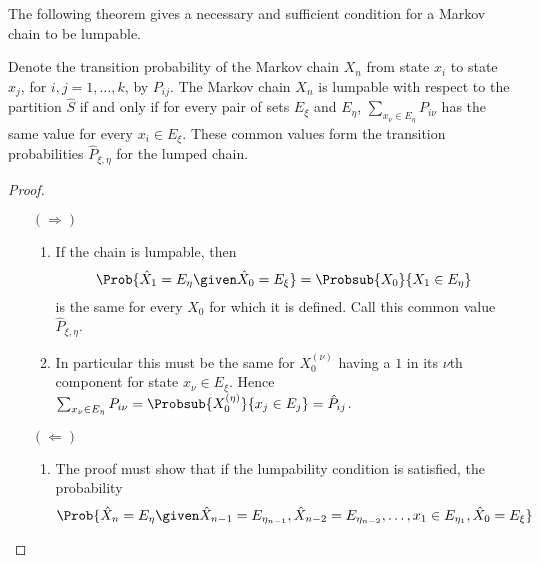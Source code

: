 \documentclass[12pt]{article}
\begin{document}
The following theorem gives a necessary and sufficient condition for a
Markov chain to be lumpable.

\begin{theorem}
    Denote the transition probability of the Markov chain \( X_n \) from
    state \( x_i \) to state \( x_j \), for \( i, j = 1, \dots, k \), by
    \( P_{ij} \).  The Markov chain \( X_n \) is lumpable with respect
    to the partition \( \hat{S} \) if and only if for every pair of sets
    \( E_{\xi} \) and \( E_{\eta} \), \( \sum_{x_{\nu} \in E_{\eta}} P_{i\nu}
    \) has the same value for every \( x_i \in E_{\xi} \). These common
    values form the transition probabilities \( \hat{P}_{\xi,\eta} \)
    for the lumped chain.
\end{theorem}

\begin{proof}
    \begin{enumerate}
        \item[\( (\Rightarrow) \)]
            \begin{enumerate}
                \item
                    If the chain is lumpable, then
                    \[
                        \Prob{\hat{X}_1 = E_{\eta} \given \hat{X}_0 = E_
                        {\xi}} = \Probsub{X_0}{X_1 \in E_{\eta} }
                    \] is the same for every \( X_0 \) for which it is
                    defined.  Call this common value \( \hat{P}_{\xi,\eta}
                    \).
                \item
                    In particular this must be the same for \( X_0^{(\nu)}
                    \) having a \( 1 \) in its \( \nu \)th component for
                    state \( x_{\nu} \in E_{\xi} \).  Hence \( \sum_{x_\nu
                    \in E_{\eta}} P_{i \nu } = \Probsub{X_0^{(\eta)}}{x_
                    {j} \in E_j} = \hat{P}_{ij} \).
            \end{enumerate}
        \item[\( (\Leftarrow) \)]
            \begin{enumerate}
                \item
                    The proof must show that if the lumpability
                    condition is satisfied, the probability
                    \[
                        \Prob{\hat{X}_n = E_\eta \given \hat{X}_{n-1} =
                        E_{\eta_ {n-1}}, \hat{X}_{n-2} = E_{\eta_{n-2}},
                        \dots, x_1 \in E_{\eta_{1}}, \hat{X}_0 =
                        E_\xi}
\]
\end{enumerate}
\end{enumerate}
\end{proof}
\end{document}
